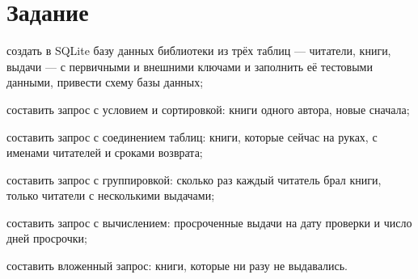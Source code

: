 \section{Задание}
\begin{bbttask}
  \item создать в SQLite базу данных библиотеки из трёх таблиц — читатели, книги, выдачи — с
  первичными и внешними ключами и заполнить её тестовыми данными, привести схему базы
  данных;\label{task:db}
  \item составить запрос с условием и сортировкой: книги одного автора, новые
  сначала;\label{task:where}
  \item составить запрос с соединением таблиц: книги, которые сейчас на руках, с именами
  читателей и сроками возврата;\label{task:join}
  \item составить запрос с группировкой: сколько раз каждый читатель брал книги, только
  читатели с несколькими выдачами;\label{task:group}
  \item составить запрос с вычислением: просроченные выдачи на дату проверки и число дней
  просрочки;\label{task:late}
  \item составить вложенный запрос: книги, которые ни разу не выдавались.\label{task:sub}
\end{bbttask}
